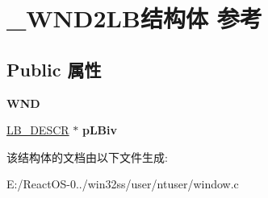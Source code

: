 \hypertarget{struct___w_n_d2_l_b}{}\section{\+\_\+\+W\+N\+D2\+L\+B结构体 参考}
\label{struct___w_n_d2_l_b}
\subsection*{Public 属性}
\begin{DoxyCompactItemize}
\item 
\mbox{\label{struct___w_n_d2_l_b_a09356b79cef19b5daf61df2506876648}} 
{\bfseries W\+ND}
\item 
\mbox{\label{struct___w_n_d2_l_b_a4db364bdc745f19f4128098194b3687f}} 
\hyperlink{struct_l_b___d_e_s_c_r}{L\+B\+\_\+\+D\+E\+S\+CR} $\ast$ {\bfseries p\+L\+Biv}
\end{DoxyCompactItemize}


该结构体的文档由以下文件生成\+:\begin{DoxyCompactItemize}
\item 
E\+:/\+React\+O\+S-\/0../win32ss/user/ntuser/window.\+c\end{DoxyCompactItemize}
